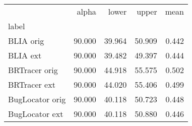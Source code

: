 \begin{tabular}{lrrrr}
\toprule
{} &  alpha &  lower &  upper &  mean \\
label           &        &        &        &       \\
\midrule
BLIA orig       & 90.000 & 39.964 & 50.909 & 0.442 \\
BLIA ext        & 90.000 & 39.482 & 49.397 & 0.444 \\
BRTracer orig   & 90.000 & 44.918 & 55.575 & 0.502 \\
BRTracer ext    & 90.000 & 44.020 & 55.406 & 0.499 \\
BugLocator orig & 90.000 & 40.118 & 50.723 & 0.448 \\
BugLocator ext  & 90.000 & 40.118 & 50.880 & 0.446 \\
\bottomrule
\end{tabular}
